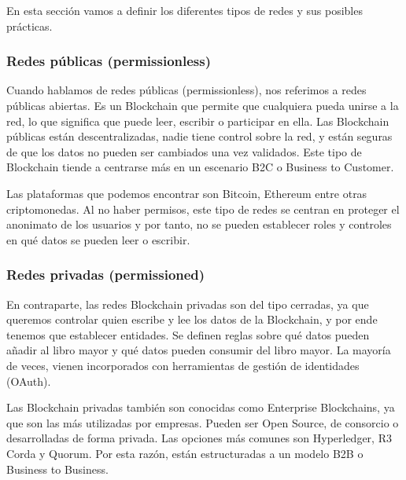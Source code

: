 \vspace{5mm}

\noindent En esta sección vamos a definir los diferentes tipos de redes y sus posibles prácticas.

\subsubsection*{Redes públicas (permissionless)}

Cuando hablamos de redes públicas (permissionless), nos referimos a redes públicas abiertas. Es un Blockchain que 
permite que cualquiera pueda unirse a la red, lo que significa que puede leer, escribir o participar en ella. Las 
Blockchain públicas están descentralizadas, nadie tiene control sobre la red, y están seguras de que los datos no 
pueden ser cambiados una vez validados. Este tipo de Blockchain tiende a centrarse más en un escenario B2C o
Business to Customer.

\vspace{5mm}

\noindent Las plataformas que podemos encontrar son Bitcoin, Ethereum entre otras criptomonedas. Al no haber permisos,
este tipo de redes se centran en proteger el anonimato de los usuarios y por tanto, no se pueden establecer roles y
controles en qué datos se pueden leer o escribir.

\subsubsection*{Redes privadas (permissioned)}

En contraparte, las redes Blockchain privadas son del tipo cerradas, ya que queremos controlar quien escribe y lee los 
datos de la Blockchain, y por ende tenemos que establecer entidades. Se definen reglas sobre qué datos pueden añadir al 
libro mayor y qué datos pueden consumir del libro mayor. La mayoría de veces, vienen incorporados con herramientas de 
gestión de identidades (OAuth). 

\vspace{5mm}

\noindent Las Blockchain privadas también son conocidas como Enterprise Blockchains, ya que son las más utilizadas por 
empresas. Pueden ser Open Source, de consorcio o desarrolladas de forma privada. Las opciones más comunes son 
Hyperledger, R3 Corda y Quorum. Por esta razón, están estructuradas a un modelo B2B o Business to Business. 

\vspace{5mm}

